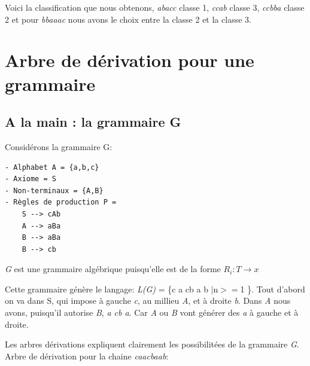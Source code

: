 \documentclass[a4paper,12pt]{report}
\begin{document}
\begin{table}[h]
\centering
{}
\caption{Calcul de distance avec des mots de classes}
\label{my-label}
\end{table}

Voici la classification que nous obtenons, \textit{abacc} classe 1, \textit{ccab} classe 3, \textit{ccbba} classe 2 et pour \textit{bbaaac} nous avons le choix entre la classe 2 et la classe 3.

\newpage
\section*{Arbre de dérivation pour une grammaire}
\subsection*{A la main : la grammaire G}
Considérons la grammaire G:

\begin{verbatim}
- Alphabet A = {a,b,c}
- Axiome = S
- Non-terminaux = {A,B}
- Règles de production P =
    S --> cAb
    A --> aBa
    B --> aBa
    B --> cb
\end{verbatim}

\textit{G} est une grammaire algébrique puisqu'elle est de la forme $R_i:T\rightarrow x$

Cette grammaire génère le langage: \textit{L(G)} = \{c a cb a b $|$n$>=$1 \}. Tout d'abord on va dans S, qui impose à gauche \textit{c}, au millieu \textit{A}, et à droite \textit{b}. Dans \textit{A} nous avons, puisqu'il autorise \textit{B}, \textit{a cb a}. Car \textit{A} ou \textit{B} vont générer des \textit{a} à gauche et à droite.

Les arbres dérivations expliquent clairement les possibilitées de la grammaire \textit{G}.\\

Arbre de dérivation pour la chaine \textit{caacbaab}:
\begin{center}
\end{center}
\end{document}
